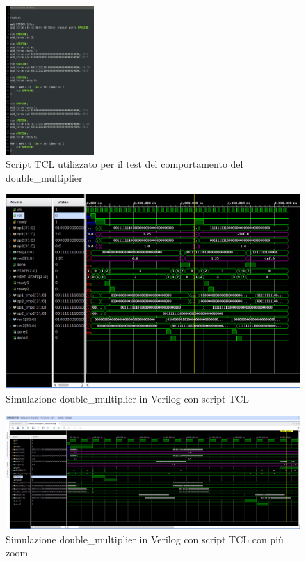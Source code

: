 \documentclass[]{IEEEtran}
\begin{document}
\begin{figure}[bt]
    \centering
    \includegraphics[width=0.3\textwidth]{figures/sim_double_script}
    \caption{Script TCL utilizzato per il test del comportamento del double\_multiplier}
    \label{fig:SCRIPT_DOUBLE}
\end{figure}

\begin{figure}[bt]
    \centering
    \includegraphics[width=\textwidth]{figures/sim_double_mult}
    \caption{Simulazione double\_multiplier in Verilog con script TCL}
    \label{fig:SIM_DOUBLE_MULT}
\end{figure}

\begin{figure}[bt]
    \centering
    \includegraphics[width=\textwidth]{figures/sim_double_mult_zoom}
    \caption{Simulazione double\_multiplier in Verilog con script TCL con più zoom}
    \label{fig:SIM_DOUBLE_MULT_ZOOM}
\end{figure}
\end{document}
